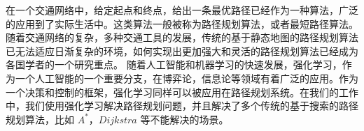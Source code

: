 \documentclass{standalone}
\begin{document}
	
\begin{chineseabstract}

在一个交通网络中，给定起点和终点，给出一条最优路径已经作为一种算法，广泛的应用到了实际生活中。这类算法一般被称为路径规划算法，或者最短路径算法。随着交通网络的复杂，多种交通工具的发展，传统的基于静态地图的路径规划算法已无法适应日渐复杂的环境，如何实现出更加强大和灵活的路径规划算法已经成为各国学者的一个研究重点。
随着人工智能和机器学习的快速发展，强化学习，作为一个人工智能的一个重要分支，在博弈论，信息论等领域有着广泛的应用。作为一个决策和控制的框架，强化学习同样可以被应用在路径规划系统。在我们的工作中，我们使用强化学习解决路径规划问题，并且解决了多个传统的基于搜索的路径规划算法，比如 $A^{*}$，$Dijkstra$ 等不能解决的场景。

\end{chineseabstract}
\end{document}
